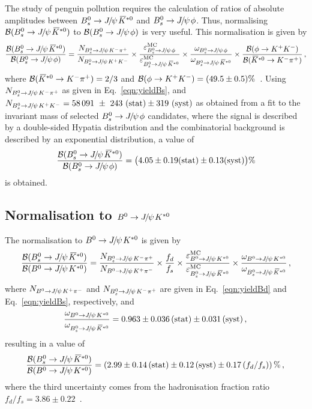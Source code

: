\documentclass[12pt,a4paper]{article}
\def\PJ      {\ensuremath{J}\xspace}
\def\Ppsi {\ensuremath{\psi}\xspace}
\def\jpsi     {{\ensuremath{{\PJ\mskip -3mu/\mskip -2mu\Ppsi\mskip 2mu}}}\xspace}
\newcommand{\BdJpsiKst}{\ensuremath{B^0\to \jpsi K^{*0}}\xspace}
\newcommand{\BdJpsiKpi}{\ensuremath{B^0\to \jpsi \Kp \pim}\xspace}
\newcommand{\BsJpsiKpi}{\ensuremath{B^0_s\to \jpsi \Km \pip}\xspace}
\newcommand{\BsJpsiKst}{\ensuremath{B^0_s\to \jpsi \Kstarzb}\xspace}
\newcommand{\BsJpsiKK}{\ensuremath{B^0_s\to \jpsi K^+K^-}\xspace}
\newcommand{\BsJpsiPhi}{\ensuremath{B^0_s\to \jpsi \phi}\xspace}
\def\Kbar  {\kern 0.2em\overline{\kern -0.2em K}{}\xspace}
\def\Kstarzb {\ensuremath{\Kbar^{*0}}\xspace}
\newcommand{\BRof}[1]{\ensuremath{{\cal B}(#1)}\xspace}
\newcommand{\Km}{\ensuremath{K^-}\xspace}
\newcommand{\Kp}{\ensuremath{K^+}\xspace}
\newcommand{\pim}{\ensuremath{\pi^-}\xspace}
\newcommand{\pip}{\ensuremath{\pi^+}\xspace}
\newcommand{\equref}[1]{Eq.~\ref{#1}}
\begin{document}
The study of penguin pollution requires the calculation of ratios of absolute amplitudes between \BsJpsiKst and \BsJpsiPhi. Thus, normalising \BRof\BsJpsiKst to \mbox{\BRof\BsJpsiPhi} is very useful. This normalisation is given by
\begin{equation}
\label{eq:norm_jpsiPhi}
\small
\frac{\BRof\BsJpsiKst}{\BRof\BsJpsiPhi} = \frac{N_{\BsJpsiKpi}}{N_{\BsJpsiKK}} \times \frac{\varepsilon_{\BsJpsiPhi}^{\rm MC}}{\varepsilon_{\BsJpsiKst}^{\rm MC}} \times \frac{\omega_{\BsJpsiPhi}}{\omega_{\BsJpsiKst}} \times \frac{\BRof{\phi\to K^+K^-}}{\BRof{\Kstarzb\to K^-\pi^+}} \,,
\end{equation}
where $\BRof{\Kstarzb\to K^-\pi^+}= 2/3$ and $\BRof{\phi\to K^+K^-} = (49.5 \pm 0.5)\%$~\cite{PDG2014}. Using $N_{\BsJpsiKpi}$ as given in \equref{eqn:yieldBs}, and $N_{\BsJpsiKK} = 58\,091~\pm~243~({\rm stat}) \pm 319~({\rm syst})$ as obtained from a fit to the invariant mass of selected \BsJpsiPhi candidates, where the signal is described by a double-sided Hypatia distribution and the combinatorial background is described by an exponential distribution, a value of
\begin{equation}
\label{eq:norm_jpsiPhi_result}
\frac{\BRof\BsJpsiKst}{\BRof\BsJpsiPhi} = \big(4.05 \pm 0.19 ({\rm stat}) \pm 0.13 ({\rm syst})\big)\% \nonumber \\
\end{equation}
is obtained.

\subsection{Normalisation to \BdJpsiKst}

The normalisation to \BdJpsiKst is given by
\begin{equation}
\label{eq:norm_jpsiKst}
\frac{\BRof\BsJpsiKst}{\BRof\BdJpsiKst} = \frac{N_{\BsJpsiKpi}}{N_{\BdJpsiKpi}}\times \frac{f_d}{f_s} \times \frac{\varepsilon_{\BdJpsiKst}^{\rm MC}}{\varepsilon_{\BsJpsiKst}^{\rm MC}} \times \frac{\omega_{\BdJpsiKst}}{\omega_{\BsJpsiKst}} \,,
\end{equation}
\noindent where $N_{\BdJpsiKpi}$ and $N_{\BsJpsiKpi}$ are given in \equref{eqn:yieldBd} and \equref{eqn:yieldBs}, respectively, and
\begin{equation}
\frac{\omega_{\BdJpsiKst}}{\omega_{\BsJpsiKst}} = 0.963 \pm 0.036\,  ({\rm stat}) \pm 0.031 \,({\rm syst}) \,, \nonumber \\
\end{equation}
\noindent resulting in a value of
\begin{equation}
\label{eq:norm_jpsiKst_result}
\frac{\BRof\BsJpsiKst}{\BRof\BdJpsiKst} = \left(2.99\pm 0.14 \, ({\rm stat}) \pm 0.12 \, ({\rm syst}) \pm 0.17\, (f_d/f_s)\right)\%  \,,  \\
\end{equation}
where the third uncertainty comes from the hadronisation fraction ratio \mbox{$f_d/f_s = 3.86 \pm 0.22$}~\cite{HFAG}.
\end{document}
